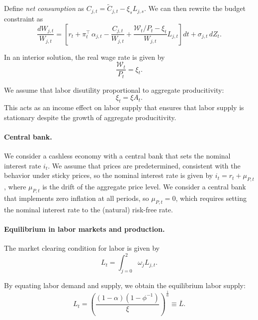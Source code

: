 Define \textit{net consumption} as $C_{j,t} = \tilde{C}_{j,t} - \xi_s L_{j,s}$. We can then rewrite the budget constraint as
\begin{equation}
    \frac{d W_{j,t}}{W_{j,t}} = \left[r_t + \pi_{t}^\top \,\alpha_{j,t}  - \frac{C_{j,t}}{W_{j,t}} + \frac{\mathcal{W}_t/P_t -\xi_t}{W_{j,t}} L_{j,t}\right] dt 
    + \sigma_{j,t}\, dZ_t.
\end{equation}

In an interior solution, the real wage rate is given by
\begin{equation}
\frac{    \mathcal{W}_t}{P_t} = \xi_t.
\end{equation}

We assume that labor disutility proportional to aggregate producitivity:
\begin{equation}
    \xi_t = \xi A_t.
\end{equation}
This acts as an income effect on labor supply that ensures that labor supply is stationary despite the growth of aggregate producitivity.

\paragraph{Central bank.} We consider a cashless economy with a central bank that sets the nominal interest rate $i_t$. 
We assume that prices are predetermined, consistent with the behavior under sticky prices, so the nominal interest rate is given by $i_t = r_t + \mu_{P,t}$, where $\mu_{P,t}$ is the drift of the aggregate price level.
We consider a central bank that implements zero inflation at all periods, so $\mu_{P,t} = 0$, which requires setting the nominal interest rate to the (natural) risk-free rate.

\paragraph{Equilibrium in labor markets and production.} The market clearing condition for labor is given by
\begin{equation}
    L_t = \int_{j=0}^2 \omega_j L_{j,t}.
\end{equation}

By equating labor demand and supply, we obtain the equilibrium labor supply:
\begin{equation}
    L_t = \left(  \frac{(1-\alpha)(1-\phi^{-1})}{\xi}\right)^{\frac{1}{\alpha}} \equiv \overline{L}.
\end{equation}

